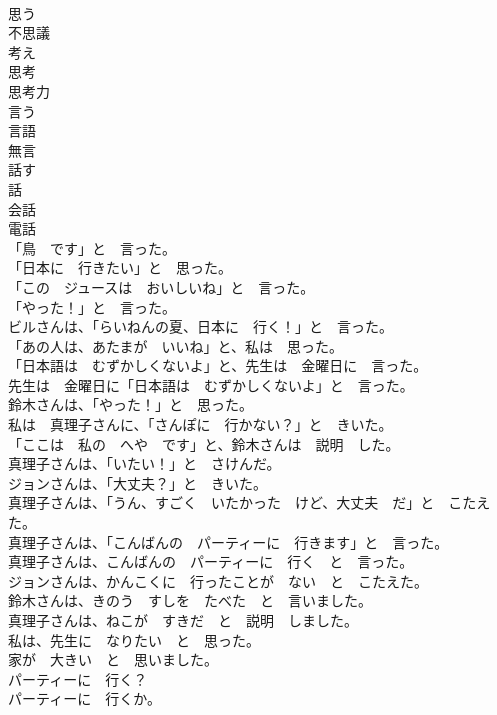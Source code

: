 \documentclass[8pt]{extreport}
\begin{document}
\begin{CJK}{UTF8}{min}
\\	思う	
\\	不思議	
\\	考え	
\\	思考	
\\	思考力	
\\	言う	
\\	言語	
\\	無言	
\\	話す	
\\	話	
\\	会話	
\\	電話	
\\	「鳥　です」と　言った。	
\\	「日本に　行きたい」と　思った。	
\\	「この　ジュースは　おいしいね」と　言った。	
\\	「やった！」と　言った。	
\\	ビルさんは、「らいねんの夏、日本に　行く！」と　言った。	
\\	「あの人は、あたまが　いいね」と、私は　思った。	
\\	「日本語は　むずかしくないよ」と、先生は　金曜日に　言った。	
\\	先生は　金曜日に「日本語は　むずかしくないよ」と　言った。	
\\	鈴木さんは、「やった！」と　思った。	
\\	私は　真理子さんに、「さんぽに　行かない？」と　きいた。	
\\	「ここは　私の　へや　です」と、鈴木さんは　説明　した。	
\\	真理子さんは、「いたい！」と　さけんだ。	
\\	ジョンさんは、「大丈夫？」と　きいた。	
\\	真理子さんは、「うん、すごく　いたかった　けど、大丈夫　だ」と　こたえた。	
\\	真理子さんは、「こんばんの　パーティーに　行きます」と　言った。	
\\	真理子さんは、こんばんの　パーティーに　行く　と　言った。	
\\	ジョンさんは、かんこくに　行ったことが　ない　と　こたえた。	
\\	鈴木さんは、きのう　すしを　たべた　と　言いました。	
\\	真理子さんは、ねこが　すきだ　と　説明　しました。	
\\	私は、先生に　なりたい　と　思った。	
\\	家が　大きい　と　思いました。	
\\	パーティーに　行く？	
\\	パーティーに　行くか。	

\end{CJK}
\end{document}
